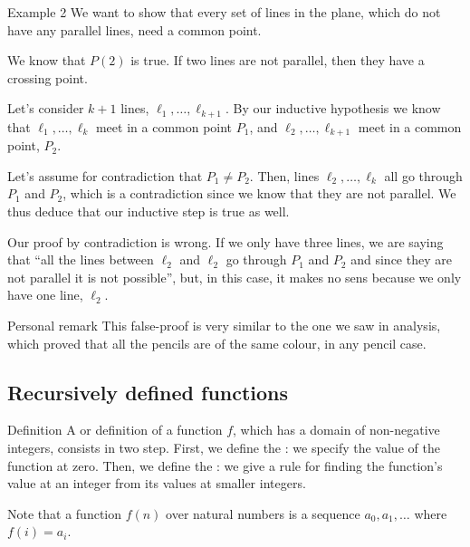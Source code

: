 \documentclass[a4paper]{article}
\begin{document}
\begin{parag}{Example 2}
    We want to show that every set of lines in the plane, which do not have any parallel lines, need a common point.

     We know that $P\left(2\right)$ is true. If two lines are not parallel, then they have a crossing point.

     Let's consider $k+1$ lines, $\ell_1, \ldots, \ell_{k+1}$. By our inductive hypothesis we know that $\ell_1, \ldots, \ell_k$ meet in a common point $P_1$, and $\ell_2, \ldots, \ell_{k+1}$ meet in a common point, $P_2$.

    Let's assume for contradiction that $P_1 \neq P_2$. Then, lines $\ell_2, \ldots, \ell_{k}$ all go through $P_1$ and $P_2$, which is a contradiction since we know that they are not parallel. We thus deduce that our inductive step is true as well.

     Our proof by contradiction is wrong. If we only have three lines, we are saying that ``all the lines between $\ell_2$ and $\ell_2$ go through $P_1$ and $P_2$ and since they are not parallel it is not possible'', but, in this case, it makes no sens because we only have one line, $\ell_2$.

    \begin{subparag}{Personal remark}
        This false-proof is very similar to the one we saw in analysis, which proved that all the pencils are of the same colour, in any pencil case.
    \end{subparag}
\end{parag}

\subsection{Recursively defined functions}
\begin{parag}{Definition}
    A  or  definition of a function $f$, which has a domain of non-negative integers, consists in two step. First, we define the : we specify the value of the function at zero. Then, we define the : we give a rule for finding the function's value at an integer from its values at smaller integers.

    Note that a function $f\left(n\right)$ over natural numbers is a sequence $a_0, a_1, \ldots$ where $f\left(i\right) = a_i$.
\end{parag}
\end{document}
